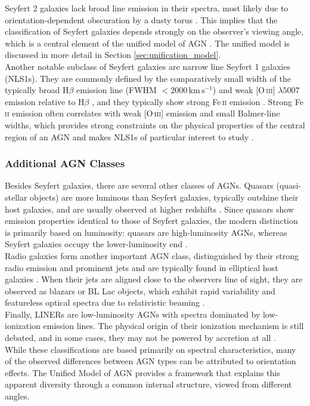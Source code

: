 Seyfert 2 galaxies lack broad line emission in their spectra, most likely due to orientation-dependent obscuration by a dusty torus \parencite{antonucci1993unified, peterson1997introduction}. This implies that the classification of Seyfert galaxies depends strongly on the observer’s viewing angle, which is a central element of the unified model of AGN \parencite{antonucci1993unified, peterson1997introduction}. The unified model is discussed in more detail in Section \ref{sec:unification_model}.\\  Another notable subclass of Seyfert galaxies are narrow line Seyfert 1 galaxies (NLS1s). They are commonly defined by the comparatively small width of the typically broad H$\beta$ emission line (FWHM $< 2000\,\mathrm{km\,s^{-1}}$) and weak [O\,\textsc{iii}] $\lambda5007$ emission relative to H$\beta$ \parencite{osterbrock1985nls1, komossa2007narrow}, and they typically show strong Fe\,\textsc{ii} emission \parencite{veron2001spectrophotometric}. Strong Fe\,\textsc{ii} emission often correlates with weak [O\,\textsc{iii}] emission and small Balmer-line widths, which provides strong constraints on the physical properties of the central region of an AGN and makes NLS1s of particular interest to study \parencite{osterbrock1985nls1, komossa2007narrow}.

\subsubsection{Additional AGN Classes}
Besides Seyfert galaxies, there are several other classes of AGNs. Quasars (quasi-stellar objects) are more luminous than Seyfert galaxies, typically outshine their host galaxies, and are usually observed at higher redshifts \parencite{netzer2013agn}. Since quasars show emission properties identical to those of Seyfert galaxies, the modern distinction is primarily based on luminosity: quasars are high-luminosity AGNs, whereas Seyfert galaxies occupy the lower-luminosity end \parencite{netzer2013agn}.\\
Radio galaxies form another important AGN class, distinguished by their strong radio emission and prominent jets and are typically found in elliptical host galaxies \parencite{netzer2013agn}. When their jets are aligned close to the observers line of sight, they are observed as blazars or BL Lac objects, which exhibit rapid variability and featureless optical spectra due to relativistic beaming \parencite{netzer2013agn}.\\
Finally, LINERs are low-luminosity AGNs with spectra dominated by low-ionization emission lines. The physical origin of their ionization mechanism is still debated, and in some cases, they may not be powered by accretion at all \parencite{netzer2013agn}.\\
While these classifications are based primarily on spectral characteristics, many of the observed differences between AGN types can be attributed to orientation effects. The Unified Model of AGN provides a framework that explains this apparent diversity through a common internal structure, viewed from different angles.

